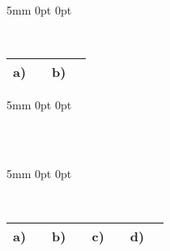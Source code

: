   {5mm}%
  {0pt}%
  {\normalfont}%
  {0pt}%
  {\bfseries}%
  {}%
  {\newline}%
  { \, \hfill {\normalfont\begin{tabular}{|p{1cm}@{/}p{1cm}|p{1cm}@{/}p{1cm}|}
                                              \hline
                                              a)&&b)& \\ 
                                              \hline
                                             \end{tabular}
\vspace{2mm}}}%

  {5mm}%
  {0pt}%
  {\normalfont}%
  {0pt}%
  {\bfseries}%
  {}%
  {\newline}%
  { \, \hfill {\normalfont\begin{tabular}{|p{1cm}@{/}p{1cm}|p{1cm}@{/}p{1cm}|p{1cm}@{/}p{1cm}|}
                                              \hline
                                              &&&&& \\ 
                                              \hline
                                             \end{tabular}
\vspace{2mm}}}%

  {5mm}%
  {0pt}%
  {\normalfont}%
  {0pt}%
  {\bfseries}%
  {}%
  {\newline}%
  { \, \hfill {\normalfont\begin{tabular}{|p{1cm}@{/}p{1cm}|p{1cm}@{/}p{1cm}|p{1cm}@{/}p{1cm}|p{1cm}@{/}p{1cm}|}
                                              \hline
                                              a)&&b)&&c)&&d)& \\ 
                                              \hline
                                             \end{tabular}
\vspace{2mm}}}%

